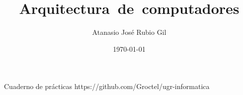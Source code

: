 \documentclass[10pt]{report}
\author{Atanasio José Rubio Gil}
\title{Arquitectura~de~computadores}
\date{\today}
\begin{document}
            {Cuaderno de prácticas}
            {https://github.com/Groctel/ugr-informatica}
\tableofcontents

\setcounter{chapter}{-1}

\end{document}
